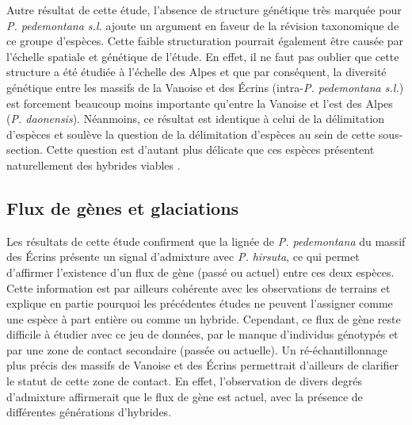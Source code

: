 \documentclass[../Master_report2.tex]{subfiles}
\begin{document}

Autre résultat de cette étude, l'absence de structure génétique très marquée pour \textit{P. pedemontana s.l.} ajoute un argument en faveur de la révision taxonomique de ce groupe d'espèces. Cette faible structuration pourrait également être causée par l'échelle spatiale et génétique de l'étude. En effet, il ne faut pas oublier que cette structure a été étudiée à l'échelle des Alpes et que par conséquent, la diversité génétique entre les massifs de la Vanoise et des Écrins (intra-\textit{P. pedemontana s.l.}) est forcement beaucoup moins importante qu'entre la Vanoise et l'est des Alpes (\textit{P. daonensis}). Néanmoins, ce résultat est identique à celui de la délimitation d'espèces \citep{Boucher2016a} et soulève la question de la délimitation d'espèces au sein de cette sous-section. Cette question est d'autant plus délicate que ces espèces présentent naturellement des hybrides viables \citep{Schorr2012}.

\subsection{Flux de gènes et glaciations}

Les résultats de cette étude confirment que la lignée de \textit{P. pedemontana} du massif des Écrins présente un signal d'admixture avec \textit{P. hirsuta}, ce qui permet d'affirmer l'existence d'un flux de gène (passé ou actuel) entre ces deux espèces. Cette information est par ailleurs cohérente avec les observations de terrains et explique en partie pourquoi les précédentes études ne peuvent l'assigner comme une espèce à part entière ou comme un hybride. Cependant, ce flux de gène reste difficile à étudier avec ce jeu de données, par le manque d'individus génotypés et par une zone de contact secondaire (passée ou actuelle). Un ré-échantillonnage plus précis des massifs de Vanoise et des Écrins permettrait d'ailleurs de clarifier le statut de cette zone de contact. En effet, l'observation de divers degrés d'admixture affirmerait que le flux de gène est actuel, avec la présence de différentes générations d'hybrides.
\end{document}
